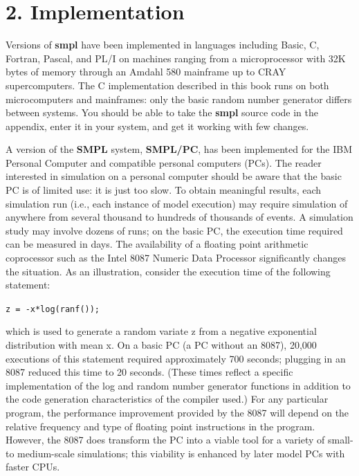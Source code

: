 \section*{2. Implementation}

Versions of \textbf{smpl} have been implemented in languages including Basic, C,
Fortran, Pascal, and PL/I on machines ranging from a microprocessor with 32K
bytes of memory through an Amdahl 580 mainframe up to CRAY supercomputers. The
C implementation described in this book runs on both microcomputers and
mainframes: only the basic random number generator differs between systems. You
should be able to take the \textbf{smpl} source code in the appendix, enter it in your
system, and get it working with few changes.

A version of the \textbf{SMPL} system, \textbf{SMPL/PC}, has been implemented for the IBM
Personal Computer and compatible personal computers (PCs). The reader
interested in simulation on a personal computer should be aware that the basic
PC is of limited use: it is just too slow. To obtain meaningful results, each
simulation run (i.e., each instance of model execution) may require simulation
of anywhere from several thousand to hundreds of thousands of events. A
simulation study may involve dozens of runs; on the basic PC, the execution
time required can be measured in days. The availability of a floating point
arithmetic coprocessor such as the Intel 8087 Numeric Data Processor
significantly changes the situation. As an illustration, consider the execution
time of the following statement:

\texttt{z = -x*log(ranf());}


which is used to generate a random variate z from a negative exponential
distribution with mean x. On a basic PC (a PC without an 8087), 20,000
executions of this statement required approximately 700 seconds; plugging in
an 8087 reduced this time to 20 seconds. (These times reflect a specific
implementation of the log and random number generator functions in addition to
the code generation characteristics of the compiler used.) For any particular
program, the performance improvement provided by the 8087 will depend on the
relative frequency and type of floating point instructions in the program.
However, the 8087 does transform the PC into a viable tool for a variety of
small- to medium-scale simulations; this viability is enhanced by later model
PCs with faster CPUs.

